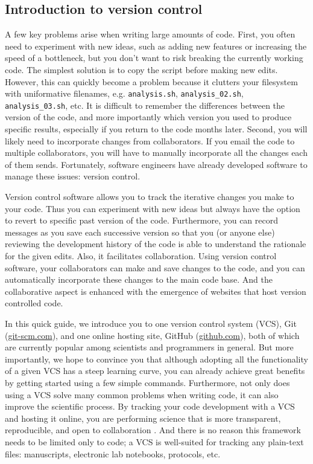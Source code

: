 \subsection{Introduction to version control}

A few key problems arise when writing large amounts of code. First, you often need to experiment with new ideas, such as adding new features or increasing the speed of a bottleneck, but you don't want to risk breaking the currently working code. The simplest solution is to copy the script before making new edits. However, this can quickly become a problem because it clutters your filesystem with uniformative filenames, e.g. \verb|analysis.sh|, \verb|analysis_02.sh|, \verb|analysis_03.sh|, etc. It is difficult to remember the differences between the version of the code, and more importantly which version you used to produce specific results, especially if you return to the code months later. Second, you will likely need to incorporate changes from collaborators. If you email the code to multiple collaborators, you will have to manually incorporate all the changes each of them sends. Fortunately, software engineers have already developed software to manage these issues: version control.

Version control software allows you to track the iterative changes you make to your code. Thus you can experiment with new ideas but always have the option to revert to specific past version of the code. Furthermore, you can record messages as you save each successive version so that you (or anyone else) reviewing the development history of the code is able to understand the rationale for the given edits. Also, it facilitates collaboration. Using version control software, your collaborators can make and save changes to the code, and you can automatically incorporate these changes to the main code base. And the collaborative aspect is enhanced with the emergence of websites that host version controlled code.

In this quick guide, we introduce you to one version control system (VCS), Git (\href{http://git-scm.com/}{git-scm.com}), and one online hosting site, GitHub (\href{https://github.com}{github.com}), both of which are currently popular among scientists and programmers in general. But more importantly, we hope to convince you that although adopting all the functionality of a given VCS has a steep learning curve, you can already achieve great benefits by getting started using a few simple commands. Furthermore, not only does using a VCS solve many common problems when writing code, it can also improve the scientific process. By tracking your code development with a VCS and hosting it online, you are performing science that is more transparent, reproducible, and open to collaboration \cite{23448176}. And there is no reason this framework needs to be limited only to code; a VCS is well-suited for tracking any plain-text files: manuscripts, electronic lab notebooks, protocols, etc.